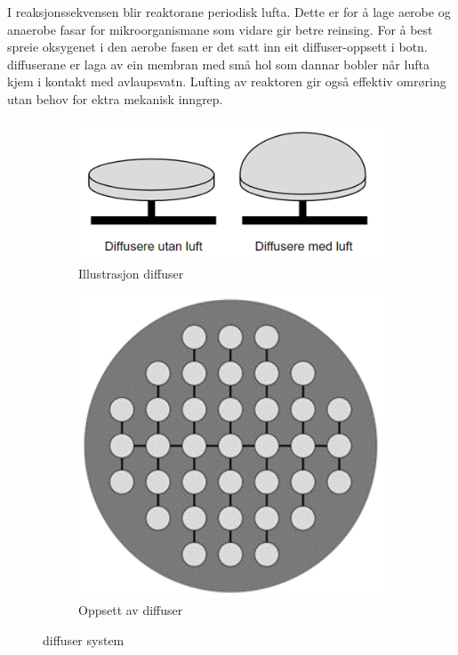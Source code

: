 I reaksjonssekvensen blir reaktorane periodisk lufta. Dette er for å lage aerobe og anaerobe fasar
for mikroorganismane som vidare gir betre reinsing.
For å best spreie oksygenet i den aerobe fasen
er det satt inn eit \gls{diffuser}-oppsett i botn.
\Gls{diffuser}ane er laga av ein membran med små hol som dannar bobler når lufta kjem i 
kontakt med avlaupsvatn.
Lufting av reaktoren gir også effektiv omrøring utan behov for ektra mekanisk inngrep.

\begin{figure}[htbp]
    \centering
    \begin{subfigure}[b]{0.3\textwidth}
        \centering
        \includegraphics[width=1\textwidth]{Figurar/DiffusereMedOgUtanLuft.png}
        \caption{Illustrasjon \gls{diffuser}}\label{fig:Illustrasjon diffuser}
    \end{subfigure}
    \hfill
    \begin{subfigure}[b]{0.3\textwidth}
        \centering
        \includegraphics[width=1\textwidth]{Figurar/DiffuserFraTopp.png}
        \caption{Oppsett av \gls{diffuser}}\label{fig:Oppsett diffuser}
    \end{subfigure}
    \caption{\Gls{diffuser} system}\label{fig:Illustrasjon-Diffuser}
\end{figure}

